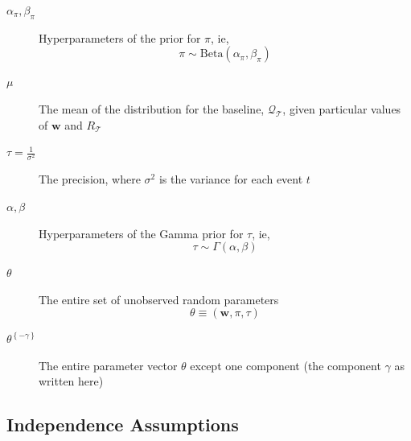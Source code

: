 \documentclass[journal]{IEEEtran}
\newcommand{\eventset}{\mathcal{T}}
\newcommand{\wvector}{\mathbf w}
\newcommand{\sumdrpower}{{\mathcal{Q}}}
\newcommand{\referencepower}{R}
\newcommand{\inreference}{\referencepower_\eventset}
\newcommand{\thetasans}[1]{\theta^{\left\{-#1\right\}}}
\begin{document}
\begin{description}
\item [$\alpha_\pi, \beta_\pi$] Hyperparameters of the prior for
  $\pi$, ie,
  \begin{equation*}
    \pi \sim \text{Beta}(\alpha_\pi, \beta_\pi )
  \end{equation*}
\item[$\mu$] The mean of the distribution for the baseline,
  $\sumdrpower_\eventset$, given particular values of $\wvector$ and
  $\inreference$
\item[$\tau = \frac{1}{\sigma^2}$] The precision, where $\sigma^2$ is
  the variance for each event $t$
\item[$\alpha, \beta$] Hyperparameters of the Gamma prior for $\tau$,
  ie,
  \begin{equation*}
    \tau \sim \Gamma(\alpha, \beta)
  \end{equation*}
\item[$\theta$] The entire set of unobserved random parameters
  \begin{equation*}
    \theta \equiv \left(\wvector, \pi, \tau \right)
  \end{equation*}
\item[$\thetasans{\gamma}$] The entire parameter vector $\theta$
  except one component (the component $\gamma$ as written here)
\end{description}

\subsection{Independence Assumptions}
\label{sec:Independence}
\end{document}

